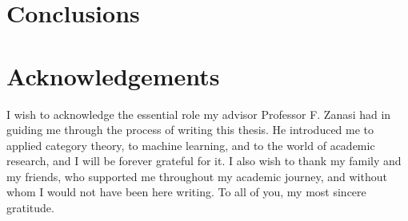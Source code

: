 \documentclass[11pt,a4paper,openright,twoside]{report}
\theoremstyle{plain}
\theoremstyle{definition}
\begin{document}

\chapter*{Conclusions}




\clearpage{\pagestyle{empty}\cleardoublepage}







{}



\clearpage{\pagestyle{empty}\cleardoublepage}





\chapter*{Acknowledgements}

\thispagestyle{empty}

I wish to acknowledge the essential role my advisor Professor F. Zanasi had in guiding me through the process of writing this thesis. He introduced me to applied category theory, to machine learning, and to the world of academic research, and I will be forever grateful for it. I also wish to thank my family and my friends, who supported me throughout my academic journey, and without whom I would not have been here writing. To all of you, my most sincere gratitude.
\end{document}
